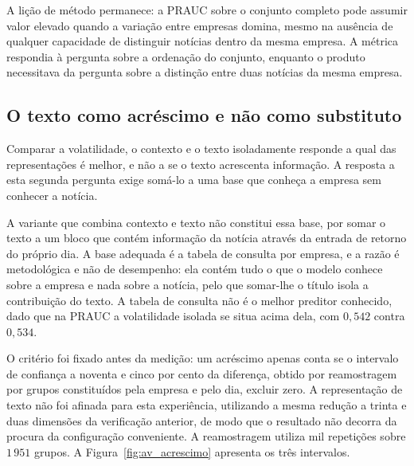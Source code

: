 A lição de método permanece: a \gls{PRAUC} sobre o conjunto completo pode assumir valor elevado
quando a variação entre empresas domina, mesmo na ausência de qualquer capacidade de distinguir
notícias dentro da mesma empresa. A métrica respondia à pergunta sobre a ordenação do conjunto,
enquanto o produto necessitava da pergunta sobre a distinção entre duas notícias da mesma empresa.

\subsection{O texto como acréscimo e não como substituto}

Comparar a volatilidade, o contexto e o texto isoladamente responde a qual das representações é
melhor, e não a se o texto acrescenta informação. A resposta a esta segunda pergunta exige somá-lo a
uma base que conheça a empresa sem conhecer a notícia.

A variante que combina contexto e texto não constitui essa base, por somar o texto a um bloco que
contém informação da notícia através da entrada de retorno do próprio dia. A base adequada é a tabela
de consulta por empresa, e a razão é metodológica e não de desempenho: ela contém tudo o que o modelo
conhece sobre a empresa e nada sobre a notícia, pelo que somar-lhe o título isola a contribuição do
texto. A tabela de consulta não é o melhor preditor conhecido, dado que na \gls{PRAUC} a volatilidade
isolada se situa acima dela, com $0{,}542$ contra $0{,}534$.

O critério foi fixado antes da medição: um acréscimo apenas conta se o intervalo de confiança a
noventa e cinco por cento da diferença, obtido por reamostragem por grupos constituídos pela empresa
e pelo dia, excluir zero. A representação de texto não foi afinada para esta experiência, utilizando
a mesma redução a trinta e duas dimensões da verificação anterior, de modo que o resultado não decorra
da procura da configuração conveniente. A reamostragem utiliza mil repetições sobre $1\,951$ grupos.
A Figura~\ref{fig:av_acrescimo} apresenta os três intervalos.

